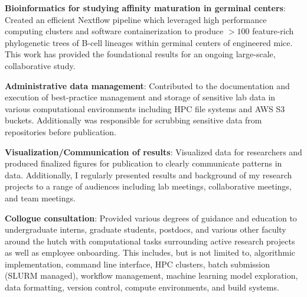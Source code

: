\documentclass[letterpaper,9pt]{article}
\newcommand{\resumeItem}[2]{
  \begin{minipage}[t]{0.9\textwidth}
    \linespread{0.80}\selectfont
    \vspace{.1cm}\item\small{
      \textbf{#1}{: #2 \vspace{1pt}}
    }
  \end{minipage}
}
\begin{document}
                \resumeItem{Bioinformatics for studying affinity maturation in germinal centers}
                    {
                        Created an efficient Nextflow pipeline 
                        which leveraged high performance computing clusters and
                        software containerization to produce $>100$ feature-rich phylogenetic trees 
                        of B-cell lineages within germinal centers of engineered mice.
                        This work has provided the foundational results for an ongoing large-scale, 
                        collaborative study.
                    }

                \resumeItem{Administrative data management}
                    {
                        Contributed to the documentation and execution of best-practice
                        management and storage of sensitive lab data in various computational 
                        environments including HPC file systems and AWS S3 buckets.
                        Additionally was responsible for scrubbing sensitive data from
                        repositories before publication.
                    }

                \resumeItem{Visualization/Communication of results}
                    {
                        Visualized data for researchers and produced finalized figures for publication
                        to clearly communicate patterns in data.
                        Additionally, I regularly presented results and background of my research projects
                        to a range of audiences including lab meetings, collaborative meetings, and team meetings.
                    }

                \resumeItem{Collogue consultation}
                    {
                        Provided various degrees of guidance and education to 
                        undergraduate interns, graduate students, postdocs, and various other faculty around the hutch
                        with computational tasks surrounding active research projects as well as employee onboarding.
                        This includes, but is not limited to,
                        algorithmic implementation,
                        command line interface,
                        HPC clusters,
                        batch submission (SLURM managed),
                        workflow management,
                        machine learning model exploration,
                        data formatting,
                        version control, 
                        compute environments, 
                        and build systems.
                    }
\end{document}
